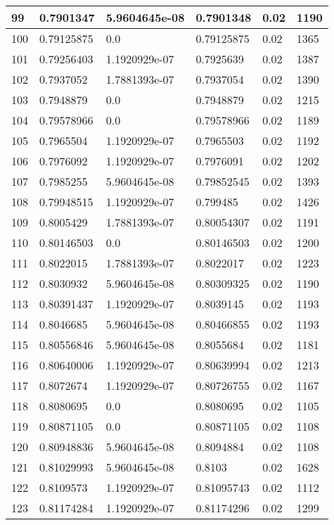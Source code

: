 \begin{longtable}{|l|l|l|l|l|l|}
99 & 0.7901347 & 5.9604645e-08 & 0.7901348 & 0.02 & 1190 \\ \hline 
100 & 0.79125875 & 0.0 & 0.79125875 & 0.02 & 1365 \\ \hline 
101 & 0.79256403 & 1.1920929e-07 & 0.7925639 & 0.02 & 1387 \\ \hline 
102 & 0.7937052 & 1.7881393e-07 & 0.7937054 & 0.02 & 1390 \\ \hline 
103 & 0.7948879 & 0.0 & 0.7948879 & 0.02 & 1215 \\ \hline 
104 & 0.79578966 & 0.0 & 0.79578966 & 0.02 & 1189 \\ \hline 
105 & 0.7965504 & 1.1920929e-07 & 0.7965503 & 0.02 & 1192 \\ \hline 
106 & 0.7976092 & 1.1920929e-07 & 0.7976091 & 0.02 & 1202 \\ \hline 
107 & 0.7985255 & 5.9604645e-08 & 0.79852545 & 0.02 & 1393 \\ \hline 
108 & 0.79948515 & 1.1920929e-07 & 0.799485 & 0.02 & 1426 \\ \hline 
109 & 0.8005429 & 1.7881393e-07 & 0.80054307 & 0.02 & 1191 \\ \hline 
110 & 0.80146503 & 0.0 & 0.80146503 & 0.02 & 1200 \\ \hline 
111 & 0.8022015 & 1.7881393e-07 & 0.8022017 & 0.02 & 1223 \\ \hline 
112 & 0.8030932 & 5.9604645e-08 & 0.80309325 & 0.02 & 1190 \\ \hline 
113 & 0.80391437 & 1.1920929e-07 & 0.8039145 & 0.02 & 1193 \\ \hline 
114 & 0.8046685 & 5.9604645e-08 & 0.80466855 & 0.02 & 1193 \\ \hline 
115 & 0.80556846 & 5.9604645e-08 & 0.8055684 & 0.02 & 1181 \\ \hline 
116 & 0.80640006 & 1.1920929e-07 & 0.80639994 & 0.02 & 1213 \\ \hline 
117 & 0.8072674 & 1.1920929e-07 & 0.80726755 & 0.02 & 1167 \\ \hline 
118 & 0.8080695 & 0.0 & 0.8080695 & 0.02 & 1105 \\ \hline 
119 & 0.80871105 & 0.0 & 0.80871105 & 0.02 & 1108 \\ \hline 
120 & 0.80948836 & 5.9604645e-08 & 0.8094884 & 0.02 & 1108 \\ \hline 
121 & 0.81029993 & 5.9604645e-08 & 0.8103 & 0.02 & 1628 \\ \hline 
122 & 0.8109573 & 1.1920929e-07 & 0.81095743 & 0.02 & 1112 \\ \hline 
123 & 0.81174284 & 1.1920929e-07 & 0.81174296 & 0.02 & 1299 \\ \hline 

\end{longtable}
